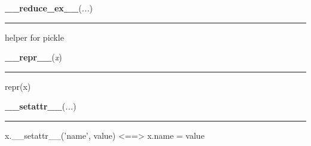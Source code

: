     \label{object:__reduce_ex__}

    \vspace{0.5ex}

    \begin{boxedminipage}{\textwidth}

    \raggedright \textbf{\_\_reduce\_ex\_\_}(\textit{...})

    \vspace{-1.5ex}

    \rule{\textwidth}{0.5\fboxrule}

helper for pickle
    \vspace{1ex}

    \end{boxedminipage}

    \label{object:__repr__}

    \vspace{0.5ex}

    \begin{boxedminipage}{\textwidth}

    \raggedright \textbf{\_\_repr\_\_}(\textit{x})

    \vspace{-1.5ex}

    \rule{\textwidth}{0.5\fboxrule}

repr(x)
    \vspace{1ex}

    \end{boxedminipage}

    \label{object:__setattr__}

    \vspace{0.5ex}

    \begin{boxedminipage}{\textwidth}

    \raggedright \textbf{\_\_setattr\_\_}(\textit{...})

    \vspace{-1.5ex}

    \rule{\textwidth}{0.5\fboxrule}

x.{\_}{\_}setattr{\_}{\_}('name', value) {\textless}=={\textgreater} x.name = value
    \vspace{1ex}

    \end{boxedminipage}

    \label{object:__str__}

